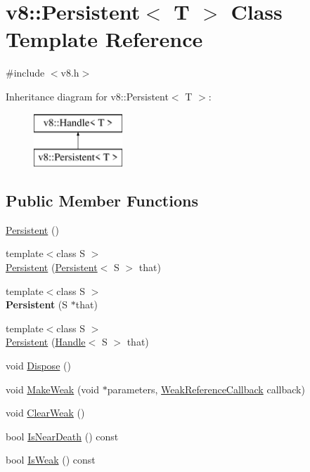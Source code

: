 \hypertarget{classv8_1_1_persistent}{}\section{v8\+:\+:Persistent$<$ T $>$ Class Template Reference}
\label{classv8_1_1_persistent}


{\ttfamily \#include $<$v8.\+h$>$}

Inheritance diagram for v8\+:\+:Persistent$<$ T $>$\+:\begin{figure}[H]
\begin{center}
\leavevmode
\includegraphics[height=2.000000cm]{classv8_1_1_persistent}
\end{center}
\end{figure}
\subsection*{Public Member Functions}
\begin{DoxyCompactItemize}
\item 
\hyperlink{classv8_1_1_persistent_aff7516636baaf209885220f7cff34463}{Persistent} ()
\item 
{\footnotesize template$<$class S $>$ }\\\hyperlink{classv8_1_1_persistent_aea24de4ad0e6cd8e102411e11fbc3948}{Persistent} (\hyperlink{classv8_1_1_persistent}{Persistent}$<$ S $>$ that)
\item 
\hypertarget{classv8_1_1_persistent_a8050e41b31d6fbdf967957d6f5db2205}{}{\footnotesize template$<$class S $>$ }\\{\bfseries Persistent} (S $\ast$that)\label{classv8_1_1_persistent_a8050e41b31d6fbdf967957d6f5db2205}

\item 
{\footnotesize template$<$class S $>$ }\\\hyperlink{classv8_1_1_persistent_a89b49f1b1903a2d625d5c3100238276e}{Persistent} (\hyperlink{classv8_1_1_handle}{Handle}$<$ S $>$ that)
\item 
void \hyperlink{classv8_1_1_persistent_a33e53191844272ba0f2da4f55fc12297}{Dispose} ()
\item 
void \hyperlink{classv8_1_1_persistent_ab04609812113450bece2640ad0b27658}{Make\+Weak} (void $\ast$parameters, \hyperlink{namespacev8_a4d5db775dbc002b23f1b55ec7ce80ea5}{Weak\+Reference\+Callback} callback)
\item 
void \hyperlink{classv8_1_1_persistent_a30806c1125371c269a02ec03d47c69ab}{Clear\+Weak} ()
\item 
bool \hyperlink{classv8_1_1_persistent_a1f60b982c5e734df7e4fe22ccd5b62cf}{Is\+Near\+Death} () const 
\item 
bool \hyperlink{classv8_1_1_persistent_aa636a55b81eee222f86866dd5ae8c06f}{Is\+Weak} () const 
\end{DoxyCompactItemize}
